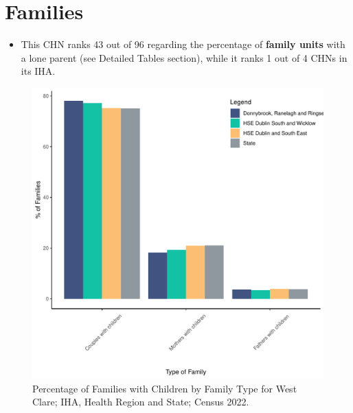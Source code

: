 \documentclass{article}
\begin{document}
\section{Families}\label{sect:Fam}
\begin{itemize}
\item This CHN ranks  43 out of 96 regarding the percentage of \textbf{family units} with a lone parent (see Detailed Tables section), while it ranks   1 out of 4 CHNs in its IHA.
\end{itemize}
\begin{figure}[H]
	\centering
	\includegraphics[width = 150mm]{../figures/FamED.pdf}
	\caption{Percentage of Families with Children by Family Type for West Clare; IHA, Health Region and State; Census 2022.}
	\label{fig:vbnv}
	\end{figure}
	
\end{document}
